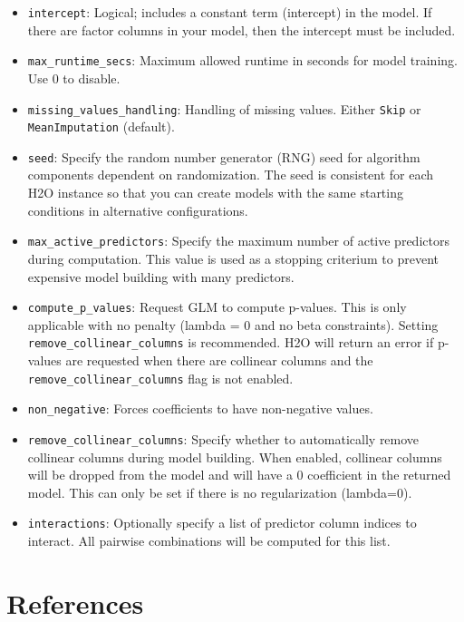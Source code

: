 \begin{itemize}
\item \texttt{intercept}: Logical; includes a constant term (intercept) in the model. If there are factor columns in your model, then the intercept must be included. %
\item \texttt{max\_runtime\_secs}: Maximum allowed runtime in seconds for model training. Use 0 to disable.
\item \texttt{missing\_values\_handling}: Handling of missing values. Either {\texttt{Skip}} or {\texttt{MeanImputation}} (default).
\item \texttt{seed}: Specify the random number generator (RNG) seed for algorithm components dependent on randomization. The seed is consistent for each H2O instance so that you can create models with the same starting conditions in alternative configurations.
\item \texttt{max\_active\_predictors}: Specify the maximum number of active predictors during computation. This value is used as a stopping criterium to prevent expensive model building with many predictors.
\item \texttt{compute\_p\_values}: Request GLM to compute p-values. This is only applicable with no penalty (lambda = 0 and no beta constraints). Setting \texttt{remove\_collinear\_columns} is recommended. H2O will return an error if p-values are requested when there are collinear columns and the \texttt{remove\_collinear\_columns} flag is not enabled.
\item \texttt{non\_negative}: Forces coefficients to have non-negative values.
\item \texttt{remove\_collinear\_columns}: Specify whether to automatically remove collinear columns during model building. When enabled, collinear columns will be dropped from the model and will have a 0 coefficient in the returned model. This can only be set if there is no regularization (lambda=0).
\item \texttt{interactions}: Optionally specify a list of predictor column indices to interact. All pairwise combinations will be computed for this list.
\end{itemize}


\newpage

\section{References}
  

